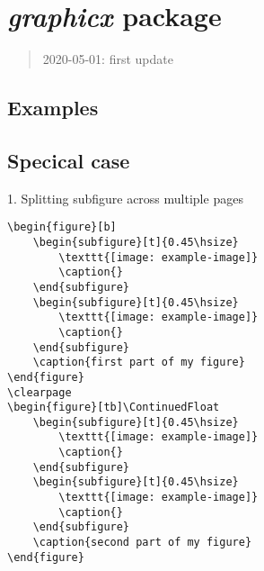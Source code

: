 \section{\textit{graphicx} package}

\begin{quote}
    2020-05-01: first update
\end{quote}


\subsection{Examples}

\subsection{Specical case}

1. Splitting subfigure across multiple pages

\begin{lstlisting}[language=Tex]
\begin{figure}[b]
    \begin{subfigure}[t]{0.45\hsize}
        \texttt{[image: example-image]}
        \caption{}
    \end{subfigure}   
    \begin{subfigure}[t]{0.45\hsize}
        \texttt{[image: example-image]}
        \caption{}
    \end{subfigure}
    \caption{first part of my figure}
\end{figure}
\clearpage   
\begin{figure}[tb]\ContinuedFloat
    \begin{subfigure}[t]{0.45\hsize}
        \texttt{[image: example-image]}
        \caption{}
    \end{subfigure}
    \begin{subfigure}[t]{0.45\hsize}
        \texttt{[image: example-image]}
        \caption{}
    \end{subfigure}
    \caption{second part of my figure}
\end{figure}
\end{lstlisting}

